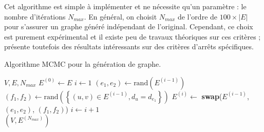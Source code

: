 \documentclass[a4paper]{article}
\begin{document}
    Cet algorithme est simple à implémenter et ne nécessite qu'un paramètre :
    le nombre d'itérations $N_{max}$. En général, on choisit $N_{max}$ de
    l'ordre de $100 \times |E|$ pour s'assurer un graphe généré indépendant de
    l'original. Cependant, ce choix est purement expérimental et il existe peu
    de travaux théoriques sur ces critères ; \cite{ray2012we} présente
    toutefois des résultats intéressants sur des critères d'arrêts spécifiques.

    \begin{algorithm}
        \caption{Algorithme MCMC pour la génération de graphe.}
        \label{alg:mcmc_joint}
        \begin{algorithmic}
            \Require $V, E, N_{max}$
            \State $E^{(0)} \gets E$
            \State $i \gets 1$
                \State $(e_1, e_2) \gets \text{rand}(E^{(i-1)})$
                \State $(f_1, f_2) \gets \text{rand}(\left\{ (u, v) \in E^{(i-1)}, d_u = d_{e_1} \right\})$
                \State $E^{(i)} \gets$
                    \textbf{swap}($E^{(i-1)}$, $(e_1, e_2)$, $(f_1, f_2)$)
                \State $i \gets i + 1$
            \EndWhile \\
            \Return $(V, E^{(N_{max})})$
        \end{algorithmic}
    \end{algorithm}

    
    
\end{document}
